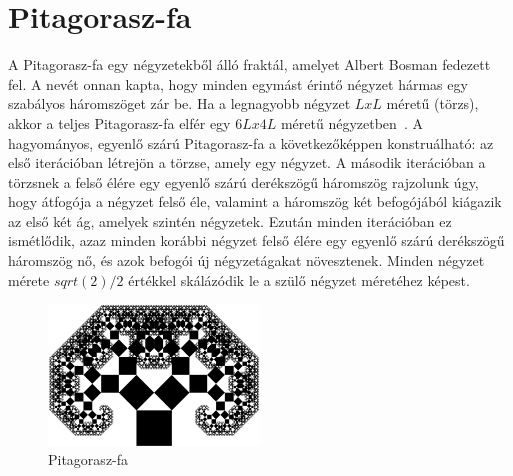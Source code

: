 \section{Pitagorasz-fa}
A Pitagorasz-fa egy négyzetekből álló fraktál, amelyet Albert Bosman fedezett fel. A nevét onnan kapta, hogy minden egymást érintő négyzet hármas egy szabályos háromszöget zár be. Ha a legnagyobb négyzet $L x L$ méretű (törzs), akkor a teljes Pitagorasz-fa elfér egy $6L x 4L$ méretű négyzetben~\cite{pitagorasz-fa}. A hagyományos, egyenlő szárú Pitagorasz-fa a következőképpen konstruálható: az első iterációban létrejön a törzse, amely egy négyzet. A második iterációban a törzsnek a felső élére egy egyenlő szárú derékszögű háromszög rajzolunk úgy, hogy átfogója a négyzet felső éle, valamint a háromszög két befogójából kiágazik az első két ág, amelyek szintén négyzetek. Ezután minden iterációban ez ismétlődik, azaz minden korábbi négyzet felső élére egy egyenlő szárú derékszögű háromszög nő, és azok befogói új négyzetágakat növesztenek. Minden négyzet mérete $sqrt(2)/2$ értékkel skálázódik le a szülő négyzet méretéhez képest.
\begin{figure}[!ht]
	\begin{center}
		\includegraphics[width=0.5\textwidth]{img/PythagorasTree}
		\caption[labelInTOC]{Pitagorasz-fa}
	\end{center}
\end{figure}


